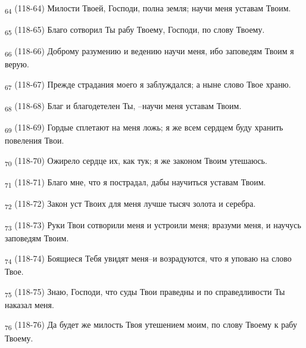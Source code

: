 \begin{tcolorbox}
\textsubscript{64} (118-64) Милости Твоей, Господи, полна земля; научи меня уставам Твоим.
\end{tcolorbox}
\begin{tcolorbox}
\textsubscript{65} (118-65) Благо сотворил Ты рабу Твоему, Господи, по слову Твоему.
\end{tcolorbox}
\begin{tcolorbox}
\textsubscript{66} (118-66) Доброму разумению и ведению научи меня, ибо заповедям Твоим я верую.
\end{tcolorbox}
\begin{tcolorbox}
\textsubscript{67} (118-67) Прежде страдания моего я заблуждался; а ныне слово Твое храню.
\end{tcolorbox}
\begin{tcolorbox}
\textsubscript{68} (118-68) Благ и благодетелен Ты, --научи меня уставам Твоим.
\end{tcolorbox}
\begin{tcolorbox}
\textsubscript{69} (118-69) Гордые сплетают на меня ложь; я же всем сердцем буду хранить повеления Твои.
\end{tcolorbox}
\begin{tcolorbox}
\textsubscript{70} (118-70) Ожирело сердце их, как тук; я же законом Твоим утешаюсь.
\end{tcolorbox}
\begin{tcolorbox}
\textsubscript{71} (118-71) Благо мне, что я пострадал, дабы научиться уставам Твоим.
\end{tcolorbox}
\begin{tcolorbox}
\textsubscript{72} (118-72) Закон уст Твоих для меня лучше тысяч золота и серебра.
\end{tcolorbox}
\begin{tcolorbox}
\textsubscript{73} (118-73) Руки Твои сотворили меня и устроили меня; вразуми меня, и научусь заповедям Твоим.
\end{tcolorbox}
\begin{tcolorbox}
\textsubscript{74} (118-74) Боящиеся Тебя увидят меня--и возрадуются, что я уповаю на слово Твое.
\end{tcolorbox}
\begin{tcolorbox}
\textsubscript{75} (118-75) Знаю, Господи, что суды Твои праведны и по справедливости Ты наказал меня.
\end{tcolorbox}
\begin{tcolorbox}
\textsubscript{76} (118-76) Да будет же милость Твоя утешением моим, по слову Твоему к рабу Твоему.
\end{tcolorbox}
